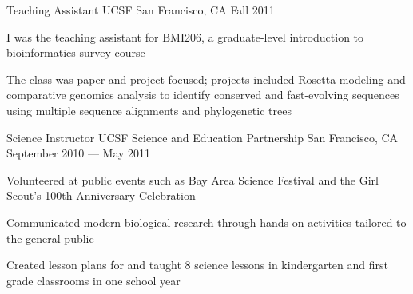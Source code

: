 \begin{cventries}
  \cventry
  {Teaching Assistant} %
  {UCSF} %
  {San Francisco, CA} %
  {Fall 2011} %
  {
    \begin{cvitems} %
    \item I was the teaching assistant for BMI206, a graduate-level introduction to bioinformatics survey course
    \item The class was paper and project focused; projects included Rosetta modeling and comparative genomics analysis to identify conserved and fast-evolving sequences using multiple sequence alignments and phylogenetic trees
    \end{cvitems}
  }

  \cventry
  {Science Instructor} %
  {UCSF Science and Education Partnership} %
  {San Francisco, CA} %
  {September 2010 --- May 2011} %
  {
    \begin{cvitems} %
    \item Volunteered at public events such as Bay Area Science Festival and the Girl Scout's 100th Anniversary Celebration
    \item Communicated modern biological research through hands-on activities tailored to the general public
    \item Created lesson plans for and taught 8 science lessons in kindergarten and first grade classrooms in one school year
    \end{cvitems}
  }

\end{cventries}
